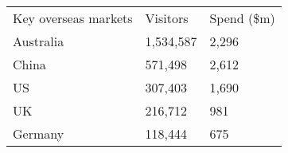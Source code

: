 \begin{tabular}[t]{p{5.1cm}>{\hfill}p{1.1cm}>{\hfill}p{1.3cm}}
 Key overseas markets & Visitors & Spend (\$m) \\ 
 Australia & 1,534,587 & 2,296 \\ 
  China &   571,498 & 2,612 \\ 
  US &   307,403 & 1,690 \\ 
  UK &   216,712 & 981 \\ 
  Germany &   118,444 & 675 \\ 
  \end{tabular}
